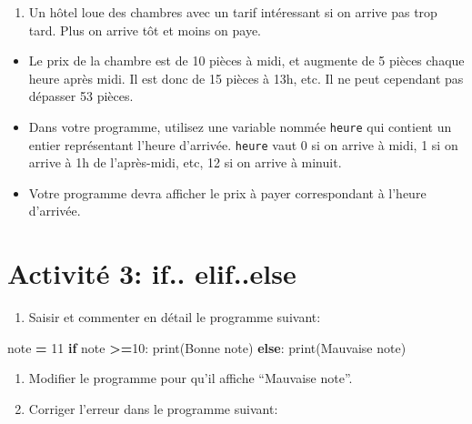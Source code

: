 \documentclass[
]{book}
\newenvironment{Shaded}{\begin{snugshade}}{\end{snugshade}}
\newcommand{\BuiltInTok}[1]{#1}
\newcommand{\ControlFlowTok}[1]{\textcolor[rgb]{0.13,0.29,0.53}{\textbf{#1}}}
\newcommand{\DecValTok}[1]{\textcolor[rgb]{0.00,0.00,0.81}{#1}}
\newcommand{\NormalTok}[1]{#1}
\newcommand{\OperatorTok}[1]{\textcolor[rgb]{0.81,0.36,0.00}{\textbf{#1}}}
\newcommand{\StringTok}[1]{\textcolor[rgb]{0.31,0.60,0.02}{#1}}
\providecommand{\tightlist}{%
  \setlength{\itemsep}{0pt}\setlength{\parskip}{0pt}}
\def\tightlist{}
\begin{document}
\begin{enumerate}
\def\labelenumi{\arabic{enumi}.}
\setcounter{enumi}{4}
\tightlist
\item
  Un hôtel loue des chambres avec un tarif intéressant si on arrive pas trop tard. Plus on arrive tôt et moins on paye.
\end{enumerate}

\begin{itemize}
\tightlist
\item
  Le prix de la chambre est de 10 pièces à midi, et augmente de 5 pièces chaque heure après midi. Il est donc de 15 pièces à 13h, etc. Il ne peut cependant pas dépasser 53 pièces.
\item
  Dans votre programme, utilisez une variable nommée \texttt{heure} qui contient un entier représentant l'heure d'arrivée. \texttt{heure} vaut 0 si on arrive à midi, 1 si on arrive à 1h de l'après-midi, etc, 12 si on arrive à minuit.
\item
  Votre programme devra afficher le prix à payer correspondant à l'heure d'arrivée.
\end{itemize}

\hypertarget{activituxe9-3-if..-elif..else}{%
\section{Activité 3: if.. elif..else}\label{activituxe9-3-if..-elif..else}}

\begin{enumerate}
\def\labelenumi{\arabic{enumi}.}
\tightlist
\item
  Saisir et commenter en détail le programme suivant:
\end{enumerate}

\begin{Shaded}
\begin{Highlighting}[]
\NormalTok{note }\OperatorTok{=} \DecValTok{11}
\ControlFlowTok{if}\NormalTok{ note }\OperatorTok{\textgreater{}=}\DecValTok{10}\NormalTok{:}
  \BuiltInTok{print}\NormalTok{(}\StringTok{\textquotesingle{}Bonne note\textquotesingle{}}\NormalTok{)}
\ControlFlowTok{else}\NormalTok{: }
  \BuiltInTok{print}\NormalTok{(}\StringTok{\textquotesingle{}Mauvaise note\textquotesingle{}}\NormalTok{)}
\end{Highlighting}
\end{Shaded}

\begin{enumerate}
\def\labelenumi{\arabic{enumi}.}
\setcounter{enumi}{1}
\tightlist
\item
  Modifier le programme pour qu'il affiche ``Mauvaise note''.
\item
  Corriger l'erreur dans le programme suivant:
\end{enumerate}
\end{document}
